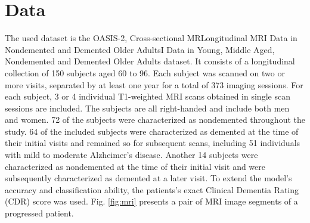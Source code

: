 \documentclass[journal]{IEEEtran}
\begin{document}
%




\section{Data}
The used dataset is the OASIS-2, Cross-sectional MRLongitudinal MRI Data in Nondemented and Demented Older AdultsI Data in Young, Middle Aged, Nondemented and Demented Older Adults dataset. It consists of a longitudinal collection of 150 subjects aged 60 to 96.  Each subject was scanned on two or more visits, separated by at least one year for a total of 373 imaging sessions. For each subject, 3 or 4 individual T1-weighted MRI scans obtained in single scan sessions are included. The subjects are all right-handed and include both men and women. 72 of the subjects were characterized as nondemented throughout the study. 64 of the included subjects were characterized as demented at the time of their initial visits and remained so for subsequent scans, including 51 individuals with mild to moderate Alzheimer’s disease. Another 14 subjects were characterized as nondemented at the time of their initial visit and were subsequently characterized as demented at a later visit. \cite{7} To extend the model's accuracy and classification ability, the patients's exact Clinical Dementia Rating (CDR) score was used. Fig. \ref{fig:mri} presents a pair of MRI image segments of a progressed patient.
\end{document}
